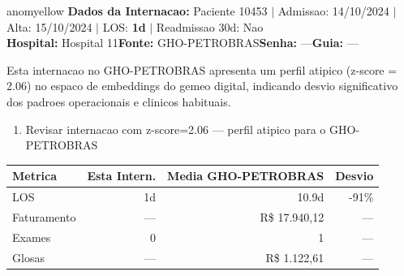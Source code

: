 \documentclass[a4paper,10pt]{article}
\begin{document}
\begin{anomalycard}[Internacao 108292 | GHO-PETROBRAS | MODERADO (z=2.06)]{anomyellow}
\textbf{Dados da Internacao:} Paciente 10453 $\mid$ Admissao: 14/10/2024 $\mid$ Alta: 15/10/2024 $\mid$ LOS: \textbf{1d} $\mid$ Readmissao 30d: Nao\\
\textbf{Hospital:} Hospital 11\quad\textbf{Fonte:} GHO-PETROBRAS\quad\textbf{Senha:} ---\quad\textbf{Guia:} ---\\
\vspace{2pt}\begin{tcolorbox}[colback=severityred!20,colframe=anomyellow,title={\textbf{Interpretacao de Negocio}},fonttitle=\bfseries\small,left=4pt,right=4pt,top=3pt,bottom=3pt]
{\small Esta internacao no GHO-PETROBRAS apresenta um perfil atipico (z-score = 2.06) no espaco de embeddings do gemeo digital, indicando desvio significativo dos padroes operacionais e clinicos habituais.}
\end{tcolorbox}
\begin{tcolorbox}[colback=severityyellow!30,colframe=anomorange,title={\textbf{Recomendacoes Especificas}},fonttitle=\bfseries\small,left=4pt,right=4pt,top=3pt,bottom=3pt]
\begin{enumerate}[nosep,leftmargin=16pt]
\item {\small Revisar internacao com z-score=2.06 --- perfil atipico para o GHO-PETROBRAS}
\end{enumerate}
\end{tcolorbox}
\begin{center}\begin{tabular}{l r r r}\toprule\textbf{Metrica} & \textbf{Esta Intern.} & \textbf{Media GHO-PETROBRAS} & \textbf{Desvio} \\\midrule
LOS & 1d & 10.9d & -91\% \\
Faturamento & --- & R\$ 17.940,12 & --- \\
Exames & 0 & 1 & --- \\
Glosas & --- & R\$ 1.122,61 & --- \\
\bottomrule\end{tabular}\end{center}


\end{anomalycard}
\end{document}
